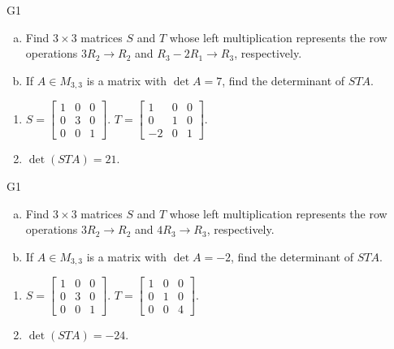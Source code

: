 \begin{problem}{G1}
\begin{enumerate}[(a)]
\item Find \(3 \times 3\) matrices \(S\) and \(T\) whose left multiplication represents the row operations \(3R_2\to R_2\) and \(R_3-2R_1\to R_3\), respectively.
\item If \(A \in M_{3,3}\) is a matrix with \(\det A = 7\), find the determinant of \(STA\). 
\end{enumerate}
\end{problem}
\begin{solution}
\begin{enumerate}
\item 
\(S= \begin{bmatrix} 1 & 0 & 0 \\ 0 & 3 & 0 \\ 0 & 0 & 1 \end{bmatrix}\).
\(T= \begin{bmatrix} 1 & 0 & 0 \\ 0 & 1 & 0 \\ -2 & 0 & 1 \end{bmatrix}\).
\item \(\det(STA)= 21\).
\end{enumerate}
\end{solution}

\begin{problem}{G1}

\begin{enumerate}[(a)]
\item Find \(3 \times 3\) matrices \(S\) and \(T\) whose left multiplication represents the row operations \(3R_2\to R_2\) and \(4R_3\to R_3\), respectively.
\item If \(A \in M_{3,3}\) is a matrix with \(\det A = -2\), find the determinant of \(STA\). 
\end{enumerate}
\end{problem}
\begin{solution}
\begin{enumerate}
\item 
\(S= \begin{bmatrix} 1 & 0 & 0 \\ 0 & 3 & 0 \\ 0 & 0 & 1 \end{bmatrix}\).
\(T= \begin{bmatrix} 1 & 0 & 0 \\ 0 & 1 & 0 \\ 0 & 0 & 4 \end{bmatrix}\).
\item \(\det(STA)= -24\).
\end{enumerate}
\end{solution}

